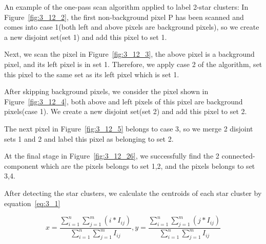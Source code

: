 
\noindent An example of the one-pass scan algorithm applied to label 2-star clusters: In Figure~\ref{fig:3_12_2}, the first non-background pixel P has been scanned and comes into case 1(both left and above pixels are background pixels), so we create a new disjoint set(set 1) and add this pixel to set 1.


\noindent Next, we scan the pixel in Figure~\ref{fig:3_12_3}, the above pixel is a background pixel, and its left pixel is in set 1. Therefore, we apply case 2 of the algorithm, set this pixel to the same set as its left pixel which is set 1.


\noindent After skipping background pixels, we consider the pixel shown in Figure~\ref{fig:3_12_4}, both above and left pixels of this pixel are background pixels(case 1). We create a new disjoint set(set 2) and add this pixel to set 2. 


\noindent The next pixel in Figure~\ref{fig:3_12_5} belongs to case 3, so we merge 2 disjoint sets 1 and 2 and label this pixel as belonging to set 2. 


\noindent At the final stage in Figure~\ref{fig:3_12_26}, we successfully find the 2 connected-component which are the pixels belongs to set 1,2, and the pixels belongs to set 3,4.


\noindent After detecting the star clusters, we calculate the centroids of each star cluster by equation~\ref{eq:3_1}

\begin{equation}
	x = \frac{\displaystyle\sum_{i=1}^{n} \displaystyle\sum_{j=1}^{m} (i * I_{ij})} {\displaystyle\sum_{i=1}^{n} \displaystyle\sum_{j=1}^{m} I_{ij}}, y = \frac{\displaystyle\sum_{i=1}^{n} \displaystyle\sum_{j=1}^{m} (j * I_{ij})} {\displaystyle\sum_{i=1}^{n} \displaystyle\sum_{j=1}^{m} I_{ij}}
	\label{eq:3_1}
\end{equation}

